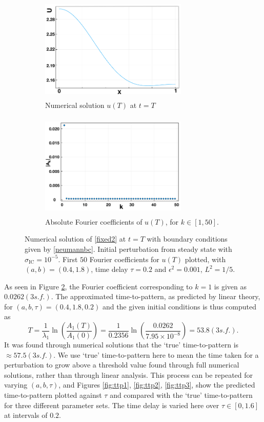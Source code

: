 \begin{figure}[H]
    \centering
    \begin{subfigure}[t]{0.45\textwidth}
        \centering
        \includegraphics[width=7cm,height=5cm]{Tu.png}
        \caption{Numerical solution $u(T)$ at $t=T$}
        \label{uT}
    \end{subfigure}
    \hfill
    \begin{subfigure}[t]{0.45\textwidth}
        \centering
        \includegraphics[width=7cm,height=5cm]{FCs.png}
        \caption{Absolute Fourier coefficients of $u(T)$, for $k\in[1,50]$.}
        \label{fig:uTfc}
    \end{subfigure}
    \caption{Numerical solution of \eqref{fixed2} at $t=T$ with boundary conditions given by \eqref{neumannbc}. Initial perturbation from steady state with $\sigma_{\text{IC}}=10^{-5}$. First $50$ Fourier coefficients for $u(T)$ plotted, with $(a,b)=(0.4,1.8)$, time delay $\tau=0.2$ and $\epsilon^2=0.001$, $L^2=1/5$.}
    \label{fig:Tfc}
\end{figure}
As seen in Figure \ref{fig:uTfc}, the Fourier coefficient corresponding to $k=1$ is given as $0.0262(3 s.f.)$. The approximated time-to-pattern, as predicted by linear theory, for $(a,b,\tau)=(0.4,1.8,0.2)$ and the given initial conditions is thus computed as
\begin{equation}
    T=\frac{1}{\lambda_1}\ln\left(\frac{A_1(T)}{A_1(0)}\right)=\frac{1}{0.2356}\ln\left(\frac{0.0262}{7.95\times10^{-8}}\right)=53.8(3 s.f.).
\end{equation}
It was found through numerical solutions that the `true' time-to-pattern is $\approx57.5(3s.f.)$.
We use `true' time-to-pattern here to mean the time taken for a perturbation to grow above a threshold value found through full numerical solutions, rather than through linear analysis. This process can be repeated for varying $(a,b,\tau)$, and Figures \ref{fig:ttp1}, \ref{fig:ttp2}, \ref{fig:ttp3}, show the predicted time-to-pattern plotted against $\tau$ and compared with the `true' time-to-pattern for three different parameter sets. The time delay is varied here over $\tau\in[0,1.6]$ at intervals of $0.2$.

